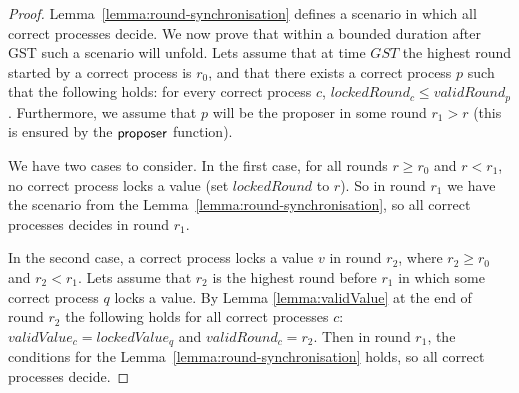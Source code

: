 \begin{proof}
Lemma~\ref{lemma:round-synchronisation} defines a scenario in which all correct processes decide. We now prove that within a bounded duration after GST such a scenario will unfold. Lets
assume that at time $GST$ the highest round started by a correct process is $r_0$, and that there exists a correct process $p$ such that the following holds: for every correct process $c$, $lockedRound_c \le validRound_p$. Furthermore, we assume that $p$ will be the proposer in some round $r_1 > r$ (this is ensured by the $\mathsf{proposer}$ function). 

We have two cases to consider. In the first case, for all rounds $r \ge r_0$ and $r < r_1$, no correct process locks a value (set $lockedRound$ to $r$). So in round $r_1$ we have the scenario from the Lemma~\ref{lemma:round-synchronisation}, so all correct processes decides in round $r_1$.  

In the second case, a correct process locks a value $v$ in round $r_2$, where $r_2 \ge r_0$ and $r_2 < r_1$.  Lets assume that $r_2$ is the highest round before $r_1$ in which some correct process $q$ locks a value. By Lemma \ref{lemma:validValue} at the end of round $r_2$ the following holds for all correct processes $c$: $validValue_c = lockedValue_q$ and $validRound_c = r_2$. Then in round $r_1$, the conditions for the Lemma~\ref{lemma:round-synchronisation} holds, so all correct processes decide.
\end{proof}	

